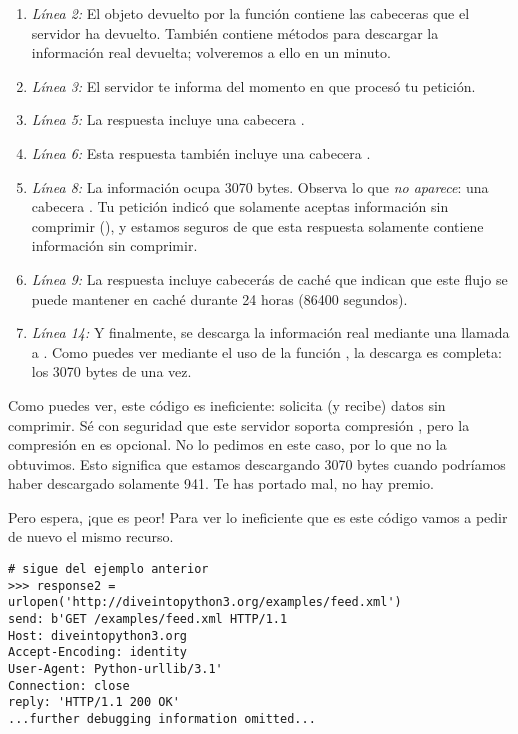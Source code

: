 \begin{enumerate}

\item \emph{Línea 2:} El objeto  devuelto por la función  contiene las cabeceras  que el servidor ha devuelto. También contiene métodos para descargar la información real devuelta; volveremos a ello en un minuto.

\item \emph{Línea 3:} El servidor te informa del momento en que procesó tu petición.

\item \emph{Línea 5:} La respuesta incluye una cabecera .

\item \emph{Línea 6:} Esta respuesta también incluye una cabecera .

\item \emph{Línea 8:} La información ocupa 3070 bytes. Observa lo que \emph{no aparece}: una cabecera . Tu petición indicó que solamente aceptas información sin comprimir (), y estamos seguros de que esta respuesta solamente contiene información sin comprimir.

\item \emph{Línea 9:} La respuesta incluye cabecerás de caché que indican que este flujo se puede mantener en caché durante 24 horas (86400 segundos).

\item \emph{Línea 14:} Y finalmente, se descarga la información real mediante una llamada a . Como puedes ver mediante el uso de la función , la descarga es completa: los 3070 bytes de una vez.

\end{enumerate}

Como puedes ver, este código es ineficiente: solicita (y recibe) datos sin comprimir. Sé con seguridad que este servidor soporta compresión , pero la compresión en  es opcional. No lo pedimos en este caso, por lo que no la obtuvimos. Esto significa que estamos descargando 3070 bytes cuando podríamos haber descargado solamente 941. Te has portado mal, no hay premio.

Pero espera, ¡que es peor! Para ver lo ineficiente que es este código vamos a pedir de nuevo el mismo recurso.

\noindent\begin{minipage}{\textwidth}
\begin{lstlisting}[mathescape=True]
# sigue del ejemplo anterior
>>> response2 = urlopen('http://diveintopython3.org/examples/feed.xml')
send: b'GET /examples/feed.xml HTTP/1.1
Host: diveintopython3.org
Accept-Encoding: identity
User-Agent: Python-urllib/3.1'
Connection: close
reply: 'HTTP/1.1 200 OK'
...further debugging information omitted...
\end{lstlisting}
\end{minipage}

